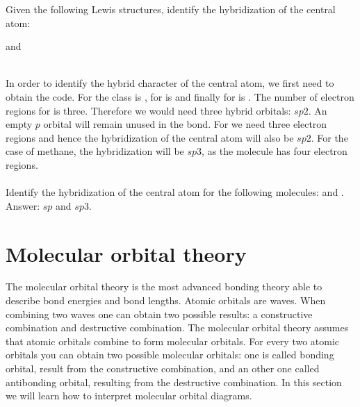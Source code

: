 \documentclass[main.tex]{subfiles}
\begin{document}
\begin{description}
\begin{example} %
Given the following Lewis structures, identify the hybridization of the central atom:
\begin{center}\hspace{.05in}\hspace{.05in}\hspace{.15in}\hspace{.05in} and \hspace{.05in}\hspace{.05in}
\end{center}
\\
In order to identify the hybrid character of the central atom, we first need to obtain the  code. For  the class is , for  is  and finally for  is . The number of electron regions for  is three. Therefore we would need three hybrid orbitals: $sp2$. An empty $p$ orbital will remain unused in the bond. For   we need three electron regions and hence the hybridization of the central atom will also be $sp2$. For the case of methane, the hybridization will be $sp3$, as the molecule has four electron regions.
\\
\faDiamond\ \\
Identify the hybridization of the central atom for the following molecules:  and .\\
\flushright Answer: $sp$  and $sp3$.
\end{example}%





\end{description}





\section{Molecular orbital theory}
The molecular orbital theory is the most advanced bonding theory able to describe bond energies and bond lengths. Atomic orbitals are waves. When combining two waves one can obtain two possible results: a constructive combination and destructive combination. The molecular orbital theory assumes that atomic orbitals combine to form molecular orbitals. For every two atomic orbitals you can obtain two possible molecular orbitals: one is called bonding orbital, result from the constructive combination, and an other one called antibonding orbital, resulting from the destructive combination. In this section we will learn how to interpret molecular orbital diagrams.
   
\end{document}
